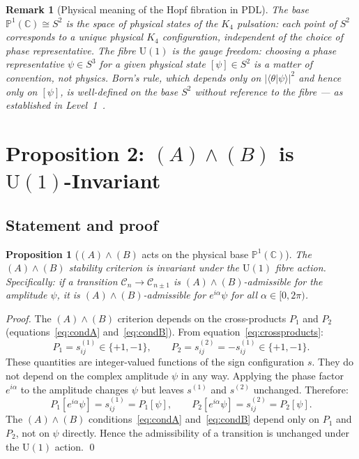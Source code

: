 \documentclass[12pt,a4paper]{article}
\newtheorem{proposition}[theorem]{Proposition}
\newtheorem{remark}[theorem]{Remark}
\newcommand{\CC}{\mathbb{C}}
\newcommand{\PP}{\mathbb{P}}
\begin{document}
\begin{remark}[Physical meaning of the Hopf fibration in PDL]
The base $\PP^1(\CC) \cong S^2$ is the space of physical states of the $K_4$ pulsation:
each point of $S^2$ corresponds to a unique physical $K_4$ configuration, independent
of the choice of phase representative. The fibre $\mathrm{U}(1)$ is the gauge freedom:
choosing a phase representative $\psi \in S^3$ for a given physical state $[\psi] \in S^2$
is a matter of convention, not physics. Born's rule, which depends only on $|{\langle\theta|\psi\rangle}|^2$
and hence only on $[\psi]$, is well-defined on the base $S^2$ without reference to
the fibre — as established in Level~1~\cite{PDL_D34_2026}.
\end{remark}

\section{Proposition 2: \texorpdfstring{$(A)\wedge(B)$}{(A)∧(B)} is \texorpdfstring{$\mathrm{U}(1)$}{U(1)}-Invariant}
\label{sec:AB_invariance}

\subsection{Statement and proof}

\begin{proposition}[$(A)\wedge(B)$ acts on the physical base $\PP^1(\CC)$]
\label{prop:P2}
The $(A)\wedge(B)$ stability criterion is invariant under the $\mathrm{U}(1)$ fibre
action. Specifically: if a transition $\mathcal{C}_n \to \mathcal{C}_{n\pm1}$ is
$(A)\wedge(B)$-admissible for the amplitude $\psi$, it is $(A)\wedge(B)$-admissible
for $e^{i\alpha}\psi$ for all $\alpha \in [0,2\pi)$.
\end{proposition}

\begin{proof}
The $(A)\wedge(B)$ criterion depends on the cross-products $P_1$ and $P_2$
(equations~\eqref{eq:condA} and~\eqref{eq:condB}). From equation~\eqref{eq:crossproducts}:
\begin{equation}
P_1 = s^{(1)}_{ij} \in \{+1,-1\}, \qquad P_2 = s^{(2)}_{ij} = -s^{(1)}_{ij} \in \{+1,-1\}.
\label{eq:P1P2}
\end{equation}
These quantities are integer-valued functions of the sign configuration $s$. They do not
depend on the complex amplitude $\psi$ in any way. Applying the phase factor
$e^{i\alpha}$ to the amplitude changes $\psi$ but leaves $s^{(1)}$ and $s^{(2)}$
unchanged. Therefore:
\begin{equation}
P_1[e^{i\alpha}\psi] = s^{(1)}_{ij} = P_1[\psi], \qquad
P_2[e^{i\alpha}\psi] = s^{(2)}_{ij} = P_2[\psi].
\label{eq:P1P2_invariant}
\end{equation}
The $(A)\wedge(B)$ conditions~\eqref{eq:condA} and~\eqref{eq:condB} depend only on
$P_1$ and $P_2$, not on $\psi$ directly. Hence the admissibility of a transition
is unchanged under the $\mathrm{U}(1)$ action. \qed
\end{proof}
\end{document}
